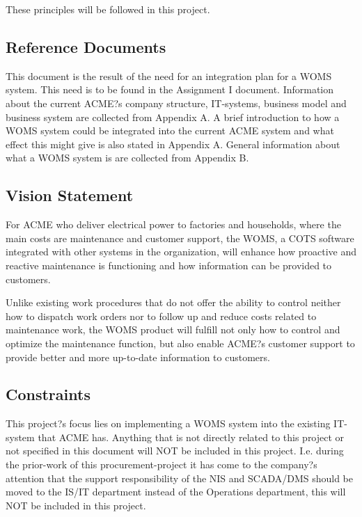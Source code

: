 \documentclass[a4paper]{article}
\begin{document}
These principles will be followed in this project. 
 
\subsection{Reference Documents} 
\label{sub:reference_documents}

This document is the result of the need for an integration plan for a WOMS system. This need is to be found in the Assignment I document. Information about the current ACME?s company structure, IT-systems, business model and business system are collected from Appendix A. A brief introduction to how a WOMS system could be integrated into the current ACME system and what effect this might give is also stated in Appendix A. General information about what a WOMS system is are collected from Appendix B.

\subsection{Vision Statement}
\label{sub:vision_statement}
For ACME who deliver electrical power to factories and households, where the main costs are maintenance and customer support, the WOMS, a COTS software integrated with other systems in the organization, will enhance how proactive and reactive maintenance is functioning and how information can be provided to customers. 

Unlike existing work procedures that do not offer the ability to control neither how to dispatch work orders nor to follow up and reduce costs related to maintenance work, the WOMS product will fulfill not only how to control and optimize the maintenance function, but also enable ACME?s customer support to provide better and more up-to-date information to customers. 

\subsection{Constraints}
\label{sub:constraints}

This project?s focus lies on implementing a WOMS system into the existing IT-system that ACME has. Anything that is not directly related to this project or not specified in this document will NOT be included in this project.  I.e. during the prior-work of this procurement-project it has come to the company?s attention that the support responsibility of the NIS and SCADA/DMS should be moved to the IS/IT department instead of the Operations department, this will NOT be included in this project. 
\end{document}
